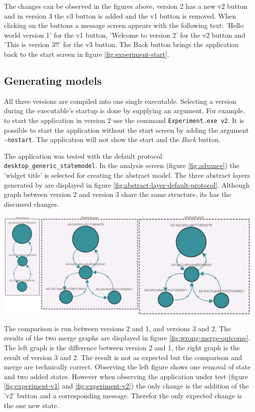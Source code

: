 The changes can be observed in the figures above, version 2 has a new v2 button and in version 3 the v3 button is added and the v1 button is removed. When clicking on the buttons a message screen appears with the following text: 'Hello world version 1' for the v1 button, 'Welcome to version 2' for the v2 button and 'This is version 3!!' for the v3 button. The Back button brings the application back to the start screen in figure \ref{fig:experiment-start}. 

\subsection{Generating models}
All three versions are compiled into one single executable. Selecting a version during the executable's startup is done by supplying an argument. For example, to start the application in version 2 use the command \verb|Experiment.exe v2|. It is possible to start the application without the start screen by adding the argument \verb|-nostart|. The application will not show the start and the \textit{Back} button. 

The application was tested with the \testar default protocol \verb|desktop_generic_statemodel|. In the \testar analysis screen (figure \ref{fig:advance}) the 'widget title' is selected for creating the abstract model.  The three abstract layers generated by \testar are displayed in figure \ref{fig:abstract-layer-default-protocol}. Although graph between version 2 and version 3 share the same structure, its has the discussed changes.

\begingroup
\captionsetup{type=figure}
\includegraphics[scale=0.45]{images/6-Default-Protocol-Abstract-Layer.png}
\label{fig:abstract-layer-default-protocol}
\endgroup

The comparison is run between versions 2 and 1, and versions 3 and 2. The results of the two merge graphs are displayed in figure \ref{fig:wrong-merge-outcome}. The left graph is the difference between version 2 and 1, the right graph is the result of version 3 and 2. The result is not as expected but the comparison and merge are technically correct. Observing the left figure shows one removal of state and two added states. However when observing the application under test (figure \ref{fig:experiment-v1} and \ref{fig:experiment-v2}) the only change is the addition of the 'v2' button and a corresponding message. Therefor the only expected change is the one new state. 

